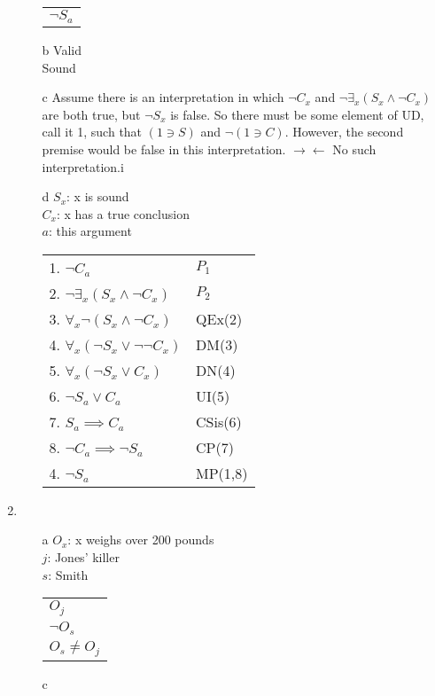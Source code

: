 \documentclass{article}
\begin{document}
\begin{enumerate}
\begin{enumerate}
\begin{tabular}{l}
						$\lnot S_a$\\
					\end{tabular}
				\item[b]
					Valid\\
					Sound
				\item[c]
					Assume there is an interpretation in which $\lnot C_x$ and $\lnot \exists _x (S_x \land \lnot C_x)$ are both true, but $\lnot S_x$ is false. So there must be some element of UD, call it 1, such that $(1 \ni S)$ and $\lnot (1 \ni C)$. However, the second premise would be false in this interpretation. $\rightarrow \leftarrow$ No such interpretation.i
				\item[d]
					$S_x$: x is sound\\
					$C_x$: x has a true conclusion\\
					$a$: this argument\\
					\begin{tabular}{l l}
						1. $\lnot C_a$ & $P_1$\\
						2. $\lnot \exists _x (S_x \land \lnot C_x)$ & $P_2$\\
						3. $\forall _x \lnot (S_x \land \lnot C_x)$ & QEx(2)\\
						4. $\forall _x (\lnot S_x \lor \lnot \lnot C_x)$ & DM(3)\\
						5. $\forall _x (\lnot S_x \lor C_x)$ & DN(4)\\
						6. $\lnot S_a \lor C_a$ & UI(5)\\
						7. $S_a \implies C_a$ & CSis(6)\\
						8. $\lnot C_a \implies \lnot S_a$ & CP(7)\\
						4. $\lnot S_a$ & MP(1,8)\\
					\end{tabular}
			\end{enumerate}
		\item
			\begin{enumerate}
				\item[a]
					$O_x$: x weighs over 200 pounds\\
					$j$: Jones' killer\\
					$s$: Smith\\
					\begin{tabular}{l}
						$O_j$\\
						$\lnot O_s$\\ \hline
						$O_s \neq O_j$\\
					\end{tabular}
				\item[c]

\end{enumerate}
\end{enumerate}
\end{document}
